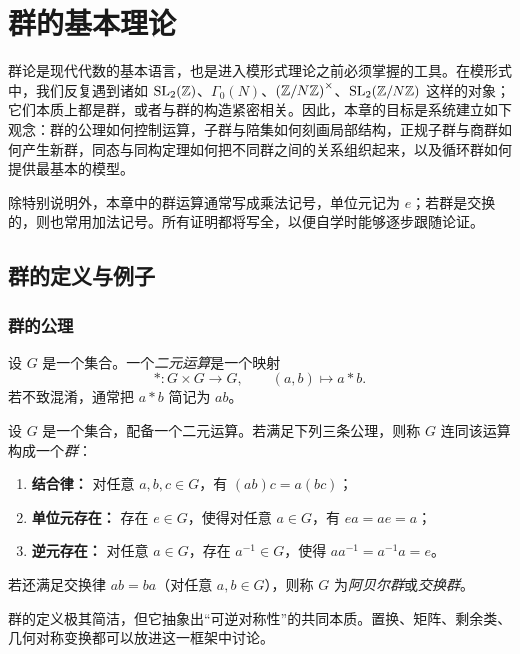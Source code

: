 \chapter{群的基本理论}

群论是现代代数的基本语言，也是进入模形式理论之前必须掌握的工具。在模形式中，我们反复遇到诸如 $\mathrm{SL}_2(\mathbb{Z})$、$\Gamma_0(N)$、$\left(\mathbb{Z}/N\mathbb{Z}\right)^\times$、$\mathrm{SL}_2(\mathbb{Z}/N\mathbb{Z})$ 这样的对象；它们本质上都是群，或者与群的构造紧密相关。因此，本章的目标是系统建立如下观念：群的公理如何控制运算，子群与陪集如何刻画局部结构，正规子群与商群如何产生新群，同态与同构定理如何把不同群之间的关系组织起来，以及循环群如何提供最基本的模型。

除特别说明外，本章中的群运算通常写成乘法记号，单位元记为 $e$；若群是交换的，则也常用加法记号。所有证明都将写全，以便自学时能够逐步跟随论证。

\section{群的定义与例子}

\subsection*{群的公理}

\begin{definition}
设 $G$ 是一个集合。一个\emph{二元运算}是一个映射
\[
*: G \times G \longrightarrow G, \qquad (a,b) \longmapsto a*b.
\]
若不致混淆，通常把 $a*b$ 简记为 $ab$。
\end{definition}

\begin{definition}
设 $G$ 是一个集合，配备一个二元运算。若满足下列三条公理，则称 $G$ 连同该运算构成一个\emph{群}：
\begin{enumerate}[label=\textnormal{(G\arabic*)}, leftmargin=3.8em]
  \item \textbf{结合律：} 对任意 $a,b,c \in G$，有 $(ab)c=a(bc)$；
  \item \textbf{单位元存在：} 存在 $e \in G$，使得对任意 $a \in G$，有 $ea=ae=a$；
  \item \textbf{逆元存在：} 对任意 $a \in G$，存在 $a^{-1} \in G$，使得 $aa^{-1}=a^{-1}a=e$。
\end{enumerate}
若还满足交换律 $ab=ba$（对任意 $a,b \in G$），则称 $G$ 为\emph{阿贝尔群}或\emph{交换群}。
\end{definition}

\begin{remark}
群的定义极其简洁，但它抽象出“可逆对称性”的共同本质。置换、矩阵、剩余类、几何对称变换都可以放进这一框架中讨论。
\end{remark}

